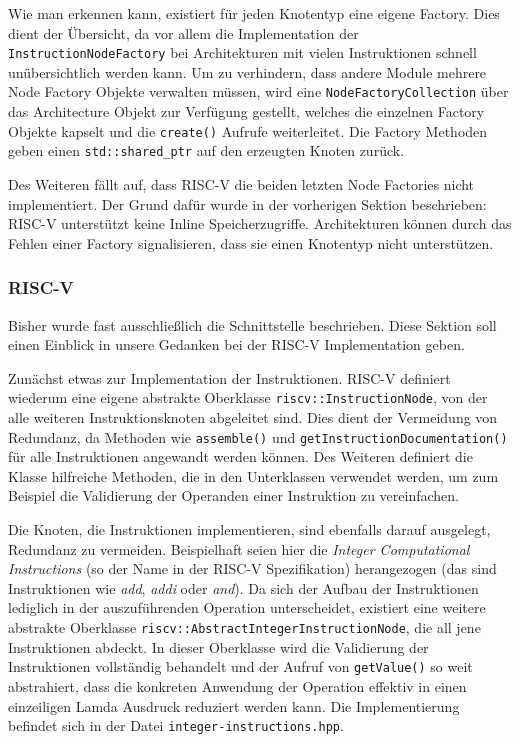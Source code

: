 Wie man erkennen kann, existiert für jeden Knotentyp eine eigene Factory. Dies
dient der Übersicht, da vor allem die Implementation der
\texttt{InstructionNodeFactory} bei Architekturen mit vielen Instruktionen
schnell unübersichtlich werden kann. Um zu verhindern, dass andere Module
mehrere Node Factory Objekte verwalten müssen, wird eine
\texttt{NodeFactoryCollection} über das Architecture Objekt zur Verfügung
gestellt, welches die einzelnen Factory Objekte kapselt und die
\texttt{create()} Aufrufe weiterleitet.
Die Factory Methoden geben einen \texttt{std::shared\_ptr} auf den erzeugten
Knoten zurück.

Des Weiteren fällt auf, dass RISC-V die beiden letzten Node Factories nicht
implementiert. Der Grund dafür wurde in der vorherigen Sektion beschrieben:
RISC-V unterstützt keine Inline Speicherzugriffe. Architekturen können durch das
Fehlen einer Factory signalisieren, dass sie einen Knotentyp nicht unterstützen.

\subsubsection{RISC-V}

Bisher wurde fast ausschließlich die Schnittstelle beschrieben. Diese Sektion
soll einen Einblick in unsere Gedanken bei der RISC-V Implementation geben.

Zunächst etwas zur Implementation der Instruktionen. RISC-V definiert wiederum
eine eigene abstrakte Oberklasse \texttt{riscv::InstructionNode}, von der alle
weiteren Instruktionsknoten abgeleitet sind. Dies dient der Vermeidung von
Redundanz, da Methoden wie \texttt{assemble()} und
\texttt{getInstructionDocumentation()} für alle Instruktionen angewandt werden
können. Des Weiteren definiert die Klasse hilfreiche Methoden, die in den
Unterklassen verwendet werden, um zum Beispiel die Validierung der Operanden
einer Instruktion zu vereinfachen.

Die Knoten, die Instruktionen implementieren, sind ebenfalls darauf ausgelegt,
Redundanz zu vermeiden. Beispielhaft seien hier die \emph{Integer
Computational Instructions} (so der Name in der RISC-V Spezifikation)
herangezogen (das sind Instruktionen wie \emph{add}, \emph{addi} oder
\emph{and}). Da sich der Aufbau der Instruktionen lediglich in der
auszuführenden Operation unterscheidet, existiert eine weitere abstrakte
Oberklasse \texttt{riscv::AbstractIntegerInstructionNode}, die all jene
Instruktionen abdeckt. In dieser Oberklasse wird die Validierung der
Instruktionen vollständig behandelt und der Aufruf von \texttt{getValue()} so
weit abstrahiert, dass die konkreten Anwendung der Operation effektiv in einen
einzeiligen Lamda Ausdruck reduziert werden kann. Die Implementierung befindet
sich in der Datei \texttt{integer-instructions.hpp}.

